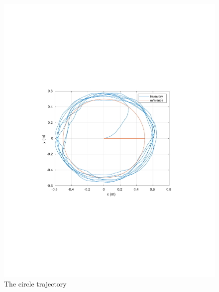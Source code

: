 
\begin{frame}
\begin{figure}[!htb]
	\centering
	\includegraphics[scale=.7,trim={3.5cm 8cm 4cm 8cm},clip]{figuras/CROB_Fuzzy_vel01_a05_circleXY/circle.pdf}
	\caption{The circle trajectory}
	\label{fig:crob_circ}
\end{figure}
\end{frame}
